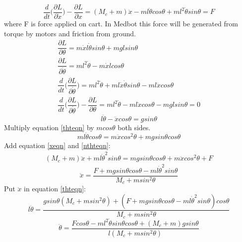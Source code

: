 \documentclass[a4paper,12pt]{article}
\begin{document}
\begin{equation} \label{xeqn}
\dfrac{d}{dt}\Bigg(\dfrac{\partial{L}}{\partial{\dot{x}}}\Bigg) - \dfrac{\partial{L}}{\partial{x}} = (M_c+m)\ddot{x} - ml\ddot{\theta}cos\theta + ml^2\dot{\theta}sin\theta = F   
\end{equation}
where F is force applied on cart. In Medbot this force will be generated from torque by motors and friction from ground.
\begin{equation*}
\begin{gathered}
\dfrac{\partial{L}}{\partial{\theta}} = m\dot{x}l\dot{\theta}sin\theta + mglsin\theta
\\
\dfrac{\partial{L}}{\partial{\dot{\theta}}} = ml^2\dot{\theta} - m\dot{x}lcos\theta
\\
\dfrac{d}{dt}\Bigg(\dfrac{\partial{L}}{\partial{\dot{\theta}}}\Bigg) = ml^2\ddot{\theta} + ml\dot{x}\dot{\theta}sin\theta - ml\ddot{x}cos\theta
\\
\dfrac{d}{dt}\Bigg(\dfrac{\partial{L}}{\partial{\dot{\theta}}}\Bigg) - \dfrac{\partial{L}}{\partial{\theta}} = ml^2\ddot{\theta} - ml\ddot{x}cos\theta - mglsin\theta = 0
\end{gathered}
\end{equation*}
\begin{equation} \label{thteqn}
l\ddot{\theta} - \ddot{x}cos\theta = gsin\theta
\end{equation}
Multiply equation \ref*{thteqn} by $mcos\theta$ both sides.
\begin{equation} \label{nthteqn}
ml\ddot{\theta}cos\theta = m\ddot{x}cos^2\theta + mgsin\theta cos\theta
\end{equation}
Add equation \ref*{xeqn} and \ref*{nthteqn}:
\begin{equation*}
\begin{gathered}
(M_c+m)\ddot{x} + ml\dot{\theta}^2sin\theta = mgsin\theta cos\theta + m\ddot{x}cos^2\theta + F
\end{gathered}
\end{equation*}
\begin{equation} \label{xddeqn}
\ddot{x} = \dfrac{F + mgsin\theta cos\theta - ml\dot{\theta}^2sin\theta}{M_c+msin^2\theta}
\end{equation}
Put $\ddot{x}$ in equation \ref*{thteqn}:
\begin{equation*}
l\ddot{\theta}=\dfrac{gsin\theta(M_c+msin^2\theta)+(F+mgsin\theta cos\theta-ml\dot{\theta}^2sin\theta)cos\theta}{M_c+msin^2\theta}
\end{equation*}
\begin{equation} \label{thtddeqn}
\ddot{\theta}=\dfrac{Fcos\theta-ml^2\dot{\theta}sin\theta cos\theta+(M_c+m)gsin\theta}{l(M_c+msin^2\theta)}
\end{equation}
\end{document}
